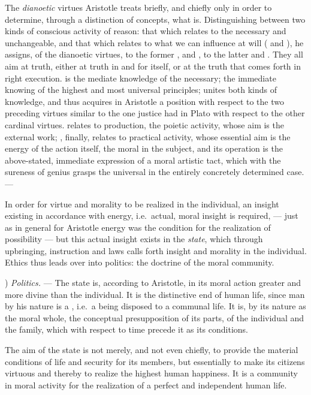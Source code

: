 The \emph{dianoetic} virtues Aristotle treats briefly,
and chiefly only in order to determine, through a distinction of concepts,
what  is. Distinguishing between two kinds of conscious activity of reason: that which relates to the
necessary and unchangeable, and that which relates to
what we can influence at will ( and
), he assigns, of the dianoetic virtues, to the former ,  and , to the latter  and . They
all aim at truth, either at truth in and for itself,
or at the truth that comes forth in right execution.
 is the mediate knowledge of the necessary; 
the immediate knowing of the highest and most universal
principles;  unites both kinds of knowledge, and thus
acquires in Aristotle a position with respect to the two preceding virtues similar to the one justice had in Plato with respect to the
other cardinal virtues.  relates to production,
the poietic activity, whose aim is the external work;
, finally, relates to practical activity,
whose essential aim is the energy of the action itself, the
moral in the subject, and its operation is the above-stated,
immediate expression of a moral artistic tact, which with
the sureness of genius grasps the universal in the entirely concretely
determined case. ---

In order for virtue and morality to be realized in the
individual, an insight existing in accordance with energy, i.e.\ actual, moral
insight is required, --- just as in general for Aristotle energy was
the condition for the realization of possibility --- but this actual
insight exists in the \emph{state}, which through upbringing, instruction and laws calls forth insight and morality in the
individual. Ethics thus leads over into politics: the doctrine of
the moral community.

) \emph{Politics.} --- The state is, according to Aristotle, in its moral action greater and more divine than the individual. It
is the distinctive end of human life, since man by
his nature is a , i.e.\ a being disposed to a communal
life. It is, by its nature as the moral whole,
the conceptual presupposition of its parts, of the individual and the family,
which with respect to time precede it as its conditions.

The aim of the state is not merely, and not even chiefly,
to provide the material conditions of life and security for
its members, but essentially to make its citizens virtuous and
thereby to realize the highest human happiness. It is a community in moral activity for the realization of a perfect and independent human life.

